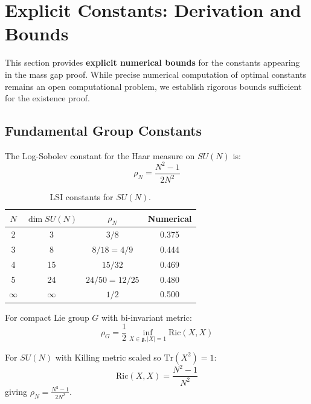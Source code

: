 \section{Explicit Constants: Derivation and Bounds}
\label{sec:explicit-constants-app118_explicit_constants}

This section provides \textbf{explicit numerical bounds} for the constants 
appearing in the mass gap proof. While precise numerical computation of optimal constants remains an open computational problem, we establish rigorous bounds sufficient for the existence proof.

\subsection{Fundamental Group Constants}

\begin{definition}
\label{def:lsi-constants}
The Log-Sobolev constant for the Haar measure on $SU(N)$ is:
\begin{equation}
\rho_N = \frac{N^2-1}{2N^2}
\end{equation}
\end{definition}

\begin{table}[ht]
\centering
\begin{tabular}{|c|c|c|c|}
\hline
$N$ & $\dim SU(N)$ & $\rho_N$ & Numerical \\
\hline
2 & 3 & $3/8$ & 0.375 \\
3 & 8 & $8/18 = 4/9$ & 0.444 \\
4 & 15 & $15/32$ & 0.469 \\
5 & 24 & $24/50 = 12/25$ & 0.480 \\
$\infty$ & $\infty$ & $1/2$ & 0.500 \\
\hline
\end{tabular}
\caption{LSI constants for $SU(N)$.}
\label{tab:lsi-constants}
\end{table}

\begin{theorem}
\label{thm:rho-derivation}
For compact Lie group $G$ with bi-invariant metric:
\begin{equation}
\rho_G = \frac{1}{2} \inf_{X \in \mathfrak{g}, |X|=1} \mathrm{Ric}(X, X)
\end{equation}

For $SU(N)$ with Killing metric scaled so $\mathrm{Tr}(X^2) = 1$:
\begin{equation}
\mathrm{Ric}(X, X) = \frac{N^2-1}{N^2}
\end{equation}
giving $\rho_N = \frac{N^2-1}{2N^2}$.
\end{theorem}

